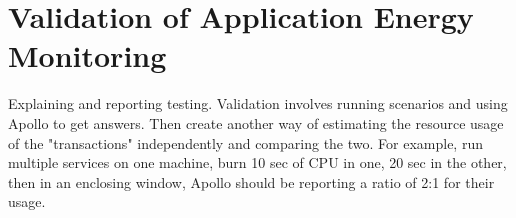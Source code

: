 \chapter{Validation of Application Energy Monitoring}

Explaining and reporting testing.  Validation involves running scenarios and using Apollo to get answers.  Then create another way of estimating the resource usage of the "transactions" independently and comparing the two.  For example, run multiple services on one machine, burn 10 sec of CPU in one, 20 sec in the other, then in an enclosing window, Apollo should be reporting a ratio of 2:1 for their usage.